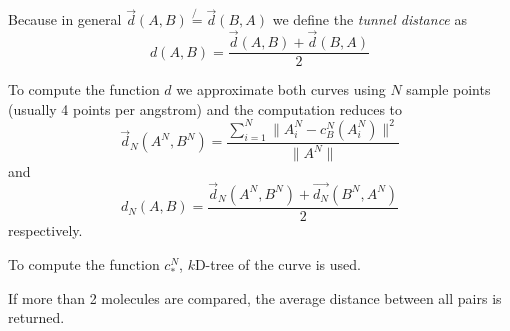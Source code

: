 \documentclass[11pt]{article} %
\begin{document}
Because in general $\vec{d}(A, B)\not{=}\vec{d}(B, A)$ we define the \textit{tunnel distance} as
\[
d(A, B)=\frac{\vec{d}(A, B)+\vec{d}(B, A)}{2}
\]

To compute the function $d$ we approximate both curves using $N$ sample points (usually 4 points per angstrom) and the computation reduces to
\[
\vec{d}_N(A^N,B^N)=\frac{\sum_{i=1}^N \|A_i^N-c_B^N(A_i^N) \|^2}{\|A^N\|}
\]
and 
\[
d_N(A, B)=\frac{\vec{d}_N(A^N, B^N)+\vec{d_N}(B^N, A^N)}{2}
\]
respectively.

To compute the function $c^N_*$, $k$D-tree \cite{kdtree} of the curve is used.

If more than 2 molecules are compared, the average distance between all pairs is returned.


\end{document}
